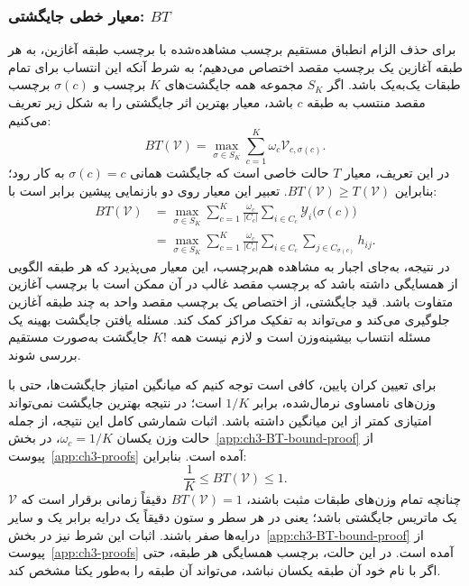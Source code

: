 \subsubsection{معیار خطی جایگشتی: \texorpdfstring{$BT$}{BT}}
\label{subsubsec:ch3-BT}
برای حذف الزام انطباق مستقیم برچسب مشاهده‌شده با برچسب طبقه آغازین، به هر طبقه آغازین یک برچسب مقصد اختصاص می‌دهیم؛ به شرط آنکه این انتساب برای تمام طبقات یک‌به‌یک باشد. اگر $S_K$ مجموعه همه جایگشت‌های $K$ برچسب و $\sigma(c)$ برچسب مقصد منتسب به طبقه $c$ باشد، معیار بهترین اثر جایگشتی را به شکل زیر تعریف می‌کنیم:
\begin{equation}\label{eq:ch3-BT-on-V}
\boxed{BT(\mathcal V)=
\max_{\sigma\in S_K}
\sum_{c=1}^{K}\omega_c\mathcal V_{c,\sigma(c)}.}
\end{equation}
در این تعریف، معیار $T$ حالت خاصی است که جایگشت همانی $\sigma(c)=c$ به کار رود؛ بنابراین $BT(\mathcal V)\ge T(\mathcal V)$. تعبیر این معیار روی دو بازنمایی پیشین برابر است با:
\begin{equation}\label{eq:ch3-BT-on-Y-H}
\begin{aligned}
BT(\mathcal V)
&=\max_{\sigma\in S_K}
\sum_{c=1}^{K}\frac{\omega_c}{|C_c|}
\sum_{i\in C_c}\mathscr Y_i\bigl(\sigma(c)\bigr)\\
&=\max_{\sigma\in S_K}
\sum_{c=1}^{K}\frac{\omega_c}{|C_c|}
\sum_{i\in C_c}\sum_{j\in C_{\sigma(c)}}h_{ij}.
\end{aligned}
\end{equation}
در نتیجه، به‌جای اجبار به مشاهده هم‌برچسب، این معیار می‌پذیرد که هر طبقه الگویی از همسایگی داشته باشد که برچسب مقصد غالب در آن ممکن است با برچسب آغازین متفاوت باشد. قید جایگشتی، از اختصاص یک برچسب مقصد واحد به چند طبقه آغازین جلوگیری می‌کند و می‌تواند به تفکیک مراکز کمک کند. مسئله یافتن جایگشت بهینه یک مسئله انتساب بیشینه‌وزن است و لازم نیست همه $K!$ جایگشت به‌صورت مستقیم بررسی شوند.

برای تعیین کران پایین، کافی است توجه کنیم که میانگین امتیاز جایگشت‌ها، حتی با وزن‌های نامساوی نرمال‌شده، برابر $1/K$ است؛ در نتیجه بهترین جایگشت نمی‌تواند امتیازی کمتر از این میانگین داشته باشد. اثبات شمارشی کامل این نتیجه، از جمله حالت وزن یکسان $\omega_c=1/K$، در بخش~\ref{app:ch3-BT-bound-proof} از پیوست~\ref{app:ch3-proofs} آمده است. بنابراین:
\begin{equation}\label{eq:ch3-BT-bounds}
\boxed{\frac{1}{K}\le BT(\mathcal V)\le1.}
\end{equation}
چنانچه تمام وزن‌های طبقات مثبت باشند، $BT(\mathcal V)=1$ دقیقاً زمانی برقرار است که $\mathcal V$ یک ماتریس جایگشتی باشد؛ یعنی در هر سطر و ستون دقیقاً یک درایه برابر یک و سایر درایه‌ها صفر باشند. اثبات این شرط نیز در بخش~\ref{app:ch3-BT-bound-proof} از پیوست~\ref{app:ch3-proofs} آمده است. در این حالت، برچسب همسایگی هر طبقه، حتی اگر با نام خود آن طبقه یکسان نباشد، می‌تواند آن طبقه را به‌طور یکتا مشخص کند.


